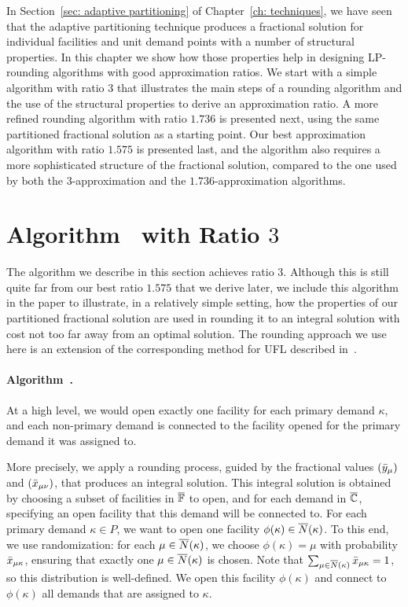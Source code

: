 \documentclass[oneside,final]{ucr}
\begin{document}
In Section~\ref{sec: adaptive partitioning} of
Chapter~\ref{ch: techniques}, we have seen that the adaptive
partitioning technique produces a fractional solution for
individual facilities and unit demand points with a number
of structural properties. In this chapter we show how those
properties help in designing LP-rounding algorithms with
good approximation ratios. We start with a simple algorithm
with ratio $3$ that illustrates the main steps of a rounding
algorithm and the use of the structural properties to derive
an approximation ratio. A more refined rounding algorithm
with ratio $1.736$ is presented next, using the same
partitioned fractional solution as a starting point. Our
best approximation algorithm with ratio $1.575$ is presented
last, and the algorithm also requires a more sophisticated
structure of the fractional solution, compared to the one
used by both the $3$-approximation and the
$1.736$-approximation algorithms.

\section{Algorithm~{\EGUP} with Ratio $3$}
\label{sec: 3-approximation}

The algorithm we describe in this section achieves ratio
$3$. Although this is still quite far from our best ratio
$1.575$ that we derive later, we include this algorithm in
the paper to illustrate, in a relatively simple setting, how
the properties of our partitioned fractional solution are
used in rounding it to an integral solution with cost not
too far away from an optimal solution.  The rounding
approach we use here is an extension of the corresponding
method for UFL described in~\cite{gupta08}.

\paragraph{Algorithm~{\EGUP.}}
At a high level, we would open exactly one facility for each
primary demand $\kappa$, and each non-primary demand is
connected to the facility opened for the primary demand it
was assigned to.

More precisely, we apply a rounding process, guided by the
fractional values $({\bar y}_{\mu})$ and $({\bar x}_{\mu\nu})$,
that produces an integral solution. This integral solution
is obtained by choosing a subset of facilities in
$\overline{\mathbb{F}}$ to open, and for each demand in $\overline{\mathbb{C}}$,
specifying an open facility that this demand will be
connected to.  For each primary demand $\kappa\in P$, we
want to open one facility $\phi(\kappa) \in
{\overline{N}}(\kappa)$. To this end, we use randomization: for each
$\mu\in{\overline{N}}(\kappa)$, we choose $\phi(\kappa) = \mu$ with
probability ${\bar x}_{\mu\kappa}$, ensuring that exactly one
$\mu \in {\overline{N}}(\kappa)$ is chosen. Note that
$\sum_{\mu\in{\overline{N}}(\kappa)}{\bar x}_{\mu\kappa}=1$, so this
distribution is well-defined.  We open this facility
$\phi(\kappa)$ and connect to $\phi(\kappa)$ all demands
that are assigned to $\kappa$.
\end{document}

